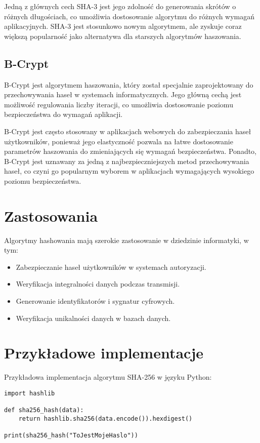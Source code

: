 \documentclass[10pt,a4paper]{article}
\begin{document}
Jedną z głównych cech SHA-3 jest jego zdolność do generowania skrótów o różnych długościach, co umożliwia dostosowanie algorytmu do różnych wymagań aplikacyjnych. SHA-3 jest stosunkowo nowym algorytmem, ale zyskuje coraz większą popularność jako alternatywa dla starszych algorytmów haszowania.

\subsection{B-Crypt}
B-Crypt jest algorytmem haszowania, który został specjalnie zaprojektowany do przechowywania haseł w systemach informatycznych. Jego główną cechą jest możliwość regulowania liczby iteracji, co umożliwia dostosowanie poziomu bezpieczeństwa do wymagań aplikacji.

B-Crypt jest często stosowany w aplikacjach webowych do zabezpieczania haseł użytkowników, ponieważ jego elastyczność pozwala na łatwe dostosowanie parametrów haszowania do zmieniających się wymagań bezpieczeństwa. Ponadto, B-Crypt jest uznawany za jedną z najbezpieczniejszych metod przechowywania haseł, co czyni go popularnym wyborem w aplikacjach wymagających wysokiego poziomu bezpieczeństwa.

\section{Zastosowania}
Algorytmy hashowania mają szerokie zastosowanie w dziedzinie informatyki, w tym:
\begin{itemize}
    \item Zabezpieczanie haseł użytkowników w systemach autoryzacji.
    \item Weryfikacja integralności danych podczas transmisji.
    \item Generowanie identyfikatorów i sygnatur cyfrowych.
    \item Weryfikacja unikalności danych w bazach danych.
\end{itemize}

\section{Przykładowe implementacje}
Przykładowa implementacja algorytmu SHA-256 w języku Python:
\begin{verbatim}
import hashlib

def sha256_hash(data):
    return hashlib.sha256(data.encode()).hexdigest()

print(sha256_hash("ToJestMojeHaslo"))
\end{verbatim}
\end{document}
